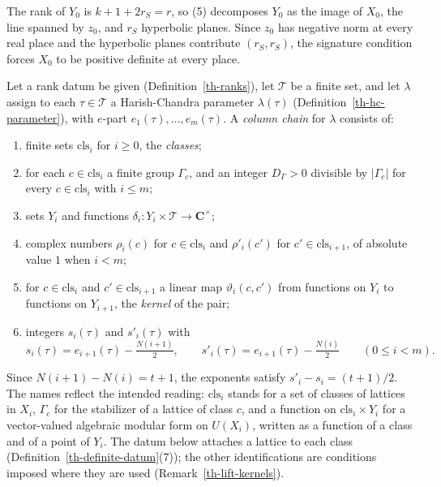 The rank of $Y_0$ is $k+1+2r_S=r$, so (5) decomposes $Y_0$ as the image of
$X_0$, the line spanned by $z_0$, and $r_S$ hyperbolic planes. Since $z_0$ has
negative norm at every real place and the hyperbolic planes contribute
$(r_S,r_S)$, the signature condition forces $X_0$ to be positive definite at
every place.

\begin{definition}\label{th-column-chain}
Let a rank datum be given (Definition~\ref{th-ranks}), let $\mathcal T$ be a
finite set, and let $\lambda$ assign to each $\tau\in\mathcal T$ a
Harish-Chandra parameter $\lambda(\tau)$ (Definition~\ref{th-hc-parameter}),
with $e$-part $e_1(\tau),\ldots,e_m(\tau)$. A \emph{column chain} for
$\lambda$ consists of:
\begin{enumerate}
\item finite sets $\mathrm{cls}_i$ for $i\geq0$, the \emph{classes};
\item for each $c\in\mathrm{cls}_i$ a finite group $\Gamma_c$, and an integer
  $D_\Gamma>0$ divisible by $|\Gamma_c|$ for every $c\in\mathrm{cls}_i$ with
  $i\leq m$;
\item sets $Y_i$ and functions $\delta_i\colon Y_i\times\mathcal T\to\mathbf
  C^\times$;
\item complex numbers $\rho_i(c)$ for $c\in\mathrm{cls}_i$ and $\rho'_i(c')$
  for $c'\in\mathrm{cls}_{i+1}$, of absolute value $1$ when $i<m$;
\item for $c\in\mathrm{cls}_i$ and $c'\in\mathrm{cls}_{i+1}$ a linear map
  $\vartheta_i(c,c')$ from functions on $Y_i$ to functions on $Y_{i+1}$, the
  \emph{kernel} of the pair;
\item integers $s_i(\tau)$ and $s'_i(\tau)$ with
  \[
  s_i(\tau)=e_{i+1}(\tau)-\tfrac{N(i+1)}2,\qquad
  s'_i(\tau)=e_{i+1}(\tau)-\tfrac{N(i)}2\qquad(0\leq i<m).
  \]
\end{enumerate}
\end{definition}

Since $N(i+1)-N(i)=t+1$, the exponents satisfy $s'_i-s_i=(t+1)/2$. The
names reflect the intended reading: $\mathrm{cls}_i$ stands for a set of
classes of lattices in $X_i$, $\Gamma_c$ for the stabilizer of a lattice of
class $c$, and a function on $\mathrm{cls}_i\times Y_i$ for a vector-valued
algebraic modular form on $U(X_i)$, written as a function of a class and of a
point of $Y_i$. The datum below attaches a lattice to each class
(Definition~\ref{th-definite-datum}(7)); the other identifications are
conditions imposed where they are used (Remark~\ref{th-lift-kernels}).

